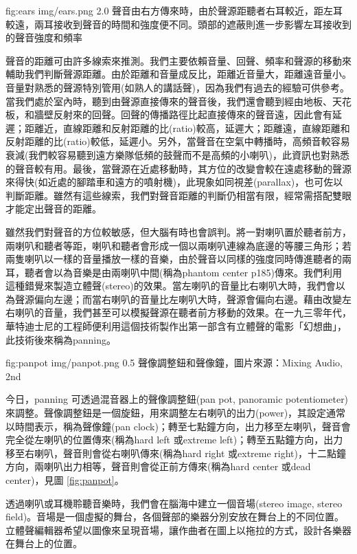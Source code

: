 \documentclass[12pt,a4paper,oneside]{report}
\begin{document}
\figurewithcaption
{fig:ears}
{img/ears.png}
{2.0}
{聲音由右方傳來時，由於聲源距聽者右耳較近，距左耳較遠，兩耳接收到聲音的時間和強度便不同。頭部的遮蔽則進一步影響左耳接收到的聲音強度和頻率}

聲音的距離可由許多線索來推測。我們主要依賴音量、回聲、頻率和聲源的移動來輔助我們判斷聲源距離。由於距離和音量成反比，距離近音量大，距離遠音量小。音量對熟悉的聲源特別管用(如熟人的講話聲)，因為我們有過去的經驗可供參考。當我們處於室內時，聽到由聲源直接傳來的聲音後，我們還會聽到經由地板、天花板，和牆壁反射來的回聲。回聲的傳播路徑比起直接傳來的聲音遠，因此會有延遲；距離近，直線距離和反射距離的比(ratio)較高，延遲大；距離遠，直線距離和反射距離的比(ratio)較低，延遲小。另外，當聲音在空氣中轉播時，高頻音較容易衰減(我們較容易聽到遠方樂隊低頻的鼓聲而不是高頻的小喇叭)，此資訊也對熟悉的聲音較有用。最後，當聲源在近處移動時，其方位的改變會較在遠處移動的聲源來得快(如近處的腳踏車和遠方的噴射機)，此現象如同視差(parallax)\cite{wiki_sound_localization}，也可佐以判斷距離。雖然有這些線索，我們對聲音距離的判斷仍相當有限，經常需搭配雙眼才能定出聲音的距離。 

雖然我們對聲音的方位較敏感，但大腦有時也會誤判。將一對喇叭置於聽者前方，兩喇叭和聽者等距，喇叭和聽者會形成一個以兩喇叭連線為底邊的等腰三角形；若兩隻喇叭以一樣的音量播放一樣的音樂，由於聲音以同樣的強度同時傳進聽者的兩耳，聽者會以為音樂是由兩喇叭中間(稱為phantom center \cite{maxing_audio}{p185})傳來。我們利用這種錯覺來製造立體聲(stereo)的效果。當左喇叭的音量比右喇叭大時，我們會以為聲源偏向左邊；而當右喇叭的音量比左喇叭大時，聲源會偏向右邊。藉由改變左右喇叭的音量，我們甚至可以模擬聲源在聽者前方移動的效果。在一九三零年代，華特迪士尼的工程師便利用這個技術製作出第一部含有立體聲的電影「幻想曲」\cite{fantasia}，此技術後來稱為panning。

\figurewithcaption
{fig:panpot}
{img/panpot.png}
{0.5}
{聲像調整鈕和聲像鐘，圖片來源：Mixing Audio, 2nd}

今日，panning 可透過混音器上的聲像調整鈕(pan pot, panoramic potentiometer)來調整。聲像調整鈕是一個旋鈕，用來調整左右喇叭的出力(power)，其設定通常以時間表示，稱為聲像鐘(pan clock)；轉至七點鐘方向，出力移至左喇叭，聲音會完全從左喇叭的位置傳來(稱為hard left 或extreme left)；轉至五點鐘方向，出力移至右喇叭，聲音則會從右喇叭傳來(稱為hard right 或extreme right)，十二點鐘方向，兩喇叭出力相等，聲音則會從正前方傳來(稱為hard center 或dead center)，見圖 \ref{fig:panpot}。


透過喇叭或耳機聆聽音樂時，我們會在腦海中建立一個音場(stereo image, stereo field)。音場是一個虛擬的舞台，各個聲部的樂器分別安放在舞台上的不同位置。 立體聲編輯器希望以圖像來呈現音場，讓作曲者在圖上以拖拉的方式，設計各樂器在舞台上的位置。
\end{document}
